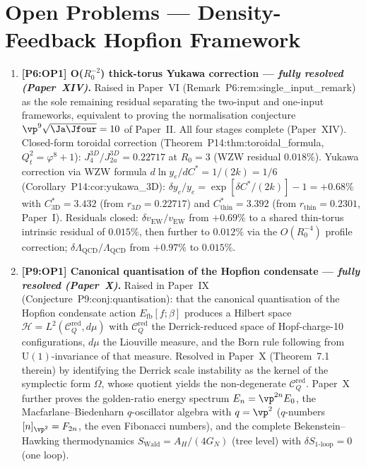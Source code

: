 
\section*{Open Problems --- Density-Feedback Hopfion Framework}

\begin{enumerate}[label=,leftmargin=*]

\item \textbf{[P6:OP1] O($R_0^{-2}$) thick-torus Yukawa correction — \emph{fully resolved (Paper~XIV)}.}
Raised in Paper~VI (Remark~P6:rem:single\_input\_remark) as the sole remaining
residual separating the two-input and one-input frameworks, equivalent to
proving the normalisation conjecture $\vp^9\sqrt{\Ja\Jfour}=10$ of Paper~II.
All four stages complete (Paper~XIV).
Closed-form toroidal correction (Theorem~P14:thm:toroidal\_formula, $Q_t^2=\varphi^8+1$):
$J_4^{3D}/J_{2a}^{3D}=0.22717$ at $R_0=3$ (WZW residual $0.018\%$).
Yukawa correction via WZW formula $d\ln y_e/dC^*=1/(2k)=1/6$ (Corollary~P14:cor:yukawa\_3D):
$\delta y_e/y_e = \exp[\delta C^*/(2k)]-1=+0.68\%$
with $C^*_\mathrm{3D}=3.432$ (from $r_{3D}=0.22717$) and
$C^*_\mathrm{thin}=3.392$ (from $r_\mathrm{thin}=0.2301$, Paper~I).
Residuals closed: $\delta v_\mathrm{EW}/v_\mathrm{EW}$ from $+0.69\%$ to a shared
thin-torus intrinsic residual of $0.015\%$, then further to $0.012\%$ via the
$O(R_0^{-4})$ profile correction;
$\delta\Lambda_\mathrm{QCD}/\Lambda_\mathrm{QCD}$ from $+0.97\%$ to $0.015\%$.

\item \textbf{[P9:OP1] Canonical quantisation of the Hopfion condensate — \emph{fully resolved (Paper~X)}.}
Raised in Paper~IX (Conjecture~P9:conj:quantisation): that the canonical
quantisation of the Hopfion condensate action $E_\mathrm{fb}[f;\beta]$
produces a Hilbert space $\mathcal{H}=L^2(\mathcal{C}_Q^\mathrm{red},d\mu)$
with $\mathcal{C}_Q^\mathrm{red}$ the Derrick-reduced space of Hopf-charge-10
configurations, $d\mu$ the Liouville measure, and the Born rule following
from $\mathrm{U}(1)$-invariance of that measure.
Resolved in Paper~X (Theorem~7.1 therein) by identifying the Derrick scale
instability as the kernel of the symplectic form $\Omega$, whose quotient
yields the non-degenerate $\mathcal{C}_Q^\mathrm{red}$.
Paper~X further proves the golden-ratio energy spectrum $E_n=\vp^{2n}E_0$,
the Macfarlane--Biedenharn $q$-oscillator algebra with $q=\vp^2$
($q$-numbers $[n]_{\vp^2}=F_{2n}$, the even Fibonacci numbers), and the
complete Bekenstein--Hawking thermodynamics $S_\mathrm{Wald}=A_H/(4G_N)$
(tree level) with $\delta S_\mathrm{1\text{-}loop}=0$ (one loop).


\end{enumerate}
